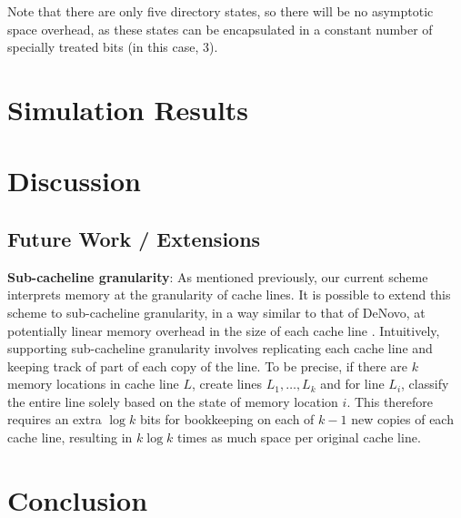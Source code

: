 \documentclass{article}
\begin{document}
Note that there are only five directory states, so there will be no asymptotic space overhead, as these states can be encapsulated in a constant number of specially treated bits (in this case, 3). 


\section{Simulation Results}

\section{Discussion}

\subsection{Future Work / Extensions}
\textbf{Sub-cacheline granularity}: As mentioned previously, our current scheme interprets memory at the granularity of cache lines. It is possible to extend this scheme to sub-cacheline granularity, in a way similar to that of DeNovo, at potentially linear memory overhead in the size of each cache line \cite{choi2010denovo}. Intuitively, supporting sub-cacheline granularity involves replicating each cache line and keeping track of part of each copy of the line. To be precise, if there are $k$ memory locations in cache line $L$, create lines $L_1, \dots, L_k$ and for line $L_i$, classify the entire line solely based on the state of memory location $i$. This therefore requires an extra $\log k$ bits for bookkeeping on each of $k-1$ new copies of each cache line, resulting in $k \log k$ times as much space per original cache line.

\section{Conclusion}

\printbibliography
\end{document}
